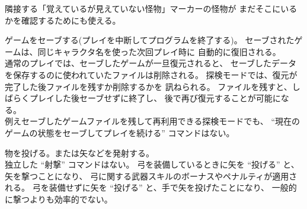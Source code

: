 隣接する「覚えているが見えていない怪物」マーカーの怪物が
まだそこにいるかを確認するためにも使える。
\item[\tb{S}]
ゲームをセーブする(プレイを中断してプログラムを終了する)。
セーブされたゲームは、同じキャラクタ名を使った次回プレイ時に
自動的に復旧される。\\
通常のプレイでは、セーブしたゲームが一旦復元されると、
セーブしたデータを保存するのに使われていたファイルは削除される。
探検モードでは、復元が完了した後ファイルを残すか削除するかを
訊ねられる。
ファイルを残すと、しばらくプレイした後セーブせずに終了し、
後で再び復元することが可能になる。\\
例えセーブしたゲームファイルを残して再利用できる探検モードでも、
``現在のゲームの状態をセーブしてプレイを続ける'' コマンドはない。
\item[\tb{t}]
物を投げる。または矢などを発射する。\\
独立した ``射撃'' コマンドはない。
弓を装備しているときに矢を ``投げる'' と、矢を撃つことになり、
弓に関する武器スキルのボーナスやペナルティが適用される。
弓を装備せずに矢を ``投げる'' と、手で矢を投げたことになり、
一般的に撃つよりも効率的でない。\\
